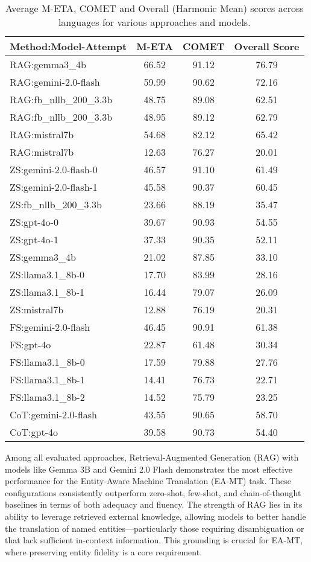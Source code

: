 \documentclass{ecai}
\begin{document}
\begin{table}[h!]
\centering
\small %
\label{tab:combined_methods_avg_scores}
\begin{tabular}{|l|c|c|c|}
\hline
\textbf{Method:Model-Attempt} & \textbf{M-ETA} & \textbf{COMET} & \textbf{Overall Score} \\
\hline
RAG:gemma3\_4b & 66.52 & 91.12 & 76.79 \\
RAG:gemini-2.0-flash & 59.99 & 90.62 & 72.16 \\
RAG:fb\_nllb\_200\_3.3b & 48.75 & 89.08 & 62.51 \\
RAG:fb\_nllb\_200\_3.3b & 48.95 & 89.12 & 62.79 \\
RAG:mistral7b & 54.68 & 82.12 & 65.42 \\
RAG:mistral7b & 12.63 & 76.27 & 20.01 \\
\hline
ZS:gemini-2.0-flash-0 & 46.57 & 91.10 & 61.49 \\
ZS:gemini-2.0-flash-1 & 45.58 & 90.37 & 60.45 \\
ZS:fb\_nllb\_200\_3.3b & 23.66 & 88.19 & 35.47 \\
ZS:gpt-4o-0 & 39.67 & 90.93 & 54.55 \\
ZS:gpt-4o-1 & 37.33 & 90.35 & 52.11 \\
ZS:gemma3\_4b & 21.02 & 87.85 & 33.10 \\
ZS:llama3.1\_8b-0 & 17.70 & 83.99 & 28.16 \\
ZS:llama3.1\_8b-1 & 16.44 & 79.07 & 26.09 \\
ZS:mistral7b & 12.88 & 76.19 & 20.31 \\
\hline
FS:gemini-2.0-flash & 46.45 & 90.91 & 61.38 \\
FS:gpt-4o & 22.87 & 61.48 & 30.34 \\
FS:llama3.1\_8b-0 & 17.59 & 79.88 & 27.76 \\
FS:llama3.1\_8b-1 & 14.41 & 76.73 & 22.71 \\
FS:llama3.1\_8b-2 & 14.52 & 75.79 & 23.25 \\
\hline
CoT:gemini-2.0-flash & 43.55 & 90.65 & 58.70 \\
CoT:gpt-4o & 39.58 & 90.73 & 54.40 \\
\hline
\end{tabular}
\caption{Average M-ETA, COMET and Overall (Harmonic Mean) scores across languages for various approaches and models.}
\end{table}

Among all evaluated approaches, Retrieval-Augmented Generation (RAG) with models like Gemma 3B 
and Gemini 2.0 Flash demonstrates the most effective performance for the Entity-Aware Machine Translation (EA-MT) task. 
These configurations consistently outperform zero-shot, few-shot, and chain-of-thought baselines in terms of both adequacy
and fluency. The strength of RAG lies in its ability to leverage retrieved external knowledge, allowing models to 
better handle the translation of named entities—particularly those requiring disambiguation or that lack sufficient 
in-context information. This grounding is crucial for EA-MT, where preserving entity fidelity is a core requirement.
\end{document}
